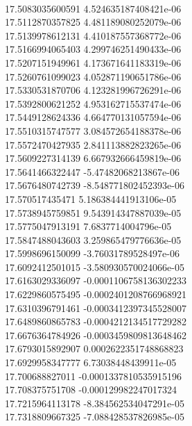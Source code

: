 { \\
17.5083035600591 4.524635187408421e-06
 \\
17.5112870357825 4.481189080252079e-06
 \\
17.5139978612131 4.410187557368772e-06
 \\
17.5166994065403 4.299746251490433e-06
 \\
17.5207151949961 4.173671641183319e-06
 \\
17.5260761099023 4.052871190651786e-06
 \\
17.5330531870706 4.123281996726291e-06
 \\
17.5392800621252 4.953162715537474e-06
 \\
17.5449128624336 4.664770131057594e-06
 \\
17.5510315747577 3.084572654188378e-06
 \\
17.5572470427935 2.841113882823265e-06
 \\
17.5609227314139 6.667932666459819e-06
 \\
17.5641466322447 -5.47482068213867e-06
 \\
17.5676480742739 -8.548771802452393e-06
 \\
17.570517435471 5.186384441913106e-05
 \\
17.5738945759851 9.543914347887039e-05
 \\
17.5775047913191 7.6837714004796e-05
 \\
17.5847488043603 3.259865479776636e-05
 \\
17.5998696150099 -3.76031789528497e-06
 \\
17.6092412501015 -3.580930570024066e-05
 \\
17.6163029336097 -0.0001106758136302233
 \\
17.6229860575495 -0.0002401208766968921
 \\
17.6310396791461 -0.0003412397345528007
 \\
17.6489860865783 -0.0004212134517729282
 \\
17.6676364784926 -0.0003459809813648462
 \\
17.6793015892907 0.0002622351748868823
 \\
17.6929958347777 6.73038448439911e-05
 \\
17.700688827011 -0.0001337810535915196
 \\
17.708375751708 -0.000129982247017324
 \\
17.7215964113178 -8.384562534047291e-05
 \\
17.7318809667325 -7.088428537826985e-05
 \\
}
